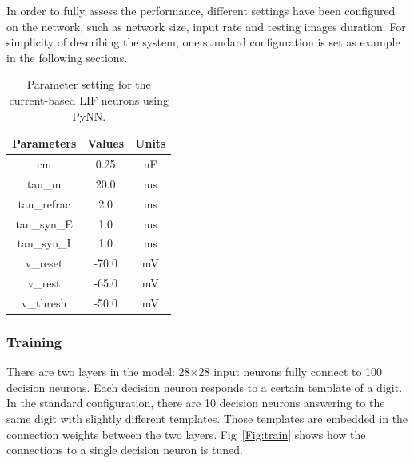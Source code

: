 In order to fully assess the performance, different settings have been configured on the network, such as network size, input rate and testing images duration.
For simplicity of describing the system, one standard configuration is set as example in the following sections.
\begin{table}[hbbp]
\centering
\caption{\label{tbl:pynnSetting}Parameter setting for the current-based LIF neurons using PyNN.}
\bgroup
\def\arraystretch{1.1}
  \begin{tabular}{c|c|c}
  Parameters & Values & Units \\
  \hline
  cm & 0.25 & nF	\\
  tau\_m & 20.0 & ms\\
  tau\_refrac & 2.0 & ms\\
  tau\_syn\_E & 1.0 & ms\\
  tau\_syn\_I & 1.0 & ms\\
  v\_reset & -70.0 & mV\\
  v\_rest & -65.0 & mV\\
  v\_thresh & -50.0 & mV\\
  \end{tabular}
\egroup
\end{table}

\subsubsection{Training}

There are two layers in the model: 28$\times$28 input neurons fully connect to 100 decision neurons.
Each decision neuron responds to a certain template of a digit.
In the standard configuration, there are 10 decision neurons answering to the same digit with slightly different templates.
Those templates are embedded in the connection weights between the two layers.
Fig~\ref{Fig:train} shows how the connections to a single decision neuron is tuned.

